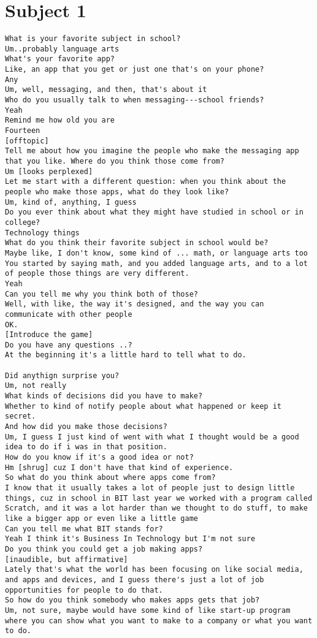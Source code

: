 \lstset{
basicstyle=\small\ttfamily,
columns=flexible,
breaklines=true
}

\section*{Subject 1}

\begin{lstlisting}
What is your favorite subject in school?
Um..probably language arts
What's your favorite app?
Like, an app that you get or just one that's on your phone?
Any
Um, well, messaging, and then, that's about it
Who do you usually talk to when messaging---school friends?
Yeah
Remind me how old you are
Fourteen
[offtopic]
Tell me about how you imagine the people who make the messaging app that you like. Where do you think those come from?
Um [looks perplexed]
Let me start with a different question: when you think about the people who make those apps, what do they look like?
Um, kind of, anything, I guess
Do you ever think about what they might have studied in school or in college?
Technology things
What do you think their favorite subject in school would be?
Maybe like, I don't know, some kind of ... math, or language arts too
You started by saying math, and you added language arts, and to a lot of people those things are very different.
Yeah
Can you tell me why you think both of those?
Well, with like, the way it's designed, and the way you can communicate with other people
OK.
[Introduce the game]
Do you have any questions ..?
At the beginning it's a little hard to tell what to do.

Did anythign surprise you?
Um, not really
What kinds of decisions did you have to make?
Whether to kind of notify people about what happened or keep it secret.
And how did you make those decisions?
Um, I guess I just kind of went with what I thought would be a good idea to do if i was in that position.
How do you know if it's a good idea or not?
Hm [shrug] cuz I don't have that kind of experience.
So what do you think about where apps come from?
I know that it usually takes a lot of people just to design little things, cuz in school in BIT last year we worked with a program called Scratch, and it was a lot harder than we thought to do stuff, to make like a bigger app or even like a little game
Can you tell me what BIT stands for?
Yeah I think it's Business In Technology but I'm not sure
Do you think you could get a job making apps?
[inaudible, but affirmative]
Lately that's what the world has been focusing on like social media, and apps and devices, and I guess there's just a lot of job opportunities for people to do that. 
So how do you think somebody who makes apps gets that job?
Um, not sure, maybe would have some kind of like start-up program where you can show what you want to make to a company or what you want to do.


\end{lstlisting}
